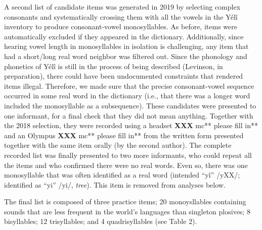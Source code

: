 \documentclass[english,,man,floatsintext]{apa6}
\begin{document}
A second list of candidate items was generated in 2019 by selecting
complex consonants and systematically crossing them with all the vowels
in the Yélî inventory to produce consonant-vowel monosyllables. As
before, items were automatically excluded if they appeared in the
dictionary. Additionally, since hearing vowel length in monosyllables in
isolation is challenging, any item that had a short/long real word
neighbor was filtered out. Since the phonology and phonetics of Yélî is
still in the process of being described (Levinson, in preparation),
there could have been undocumented constraints that rendered items
illegal. Therefore, we made sure that the precise consonant-vowel
sequence occurred in some real word in the dictionary (i.e., that there
was a longer word included the monosyllable as a subsequence). These
candidates were presented to one informant, for a final check that they
did not mean anything. Together with the 2018 selection, they were
recorded using a headset \textbf{XXX }mc** please fill in** and an
Olympus \textbf{XXX }mc** please fill in** from the written form
presented together with the same item orally (by the second author). The
complete recorded list was finally presented to two more informants, who
could repeat all the items and who confirmed there were no real words.
Even so, there was one monosyllable that was often identified as a real
word (intended ``yî'' /yXX/; identified as ``yi'' /yi/, \emph{tree}).
This item is removed from analyses below.

The final list is composed of three practice items; 20 monoysllables
containing sounds that are less frequent in the world's languages than
singleton plosives; 8 bisyllables; 12 trisyllables; and 4
quadrisyllables (see Table 2).
\end{document}

